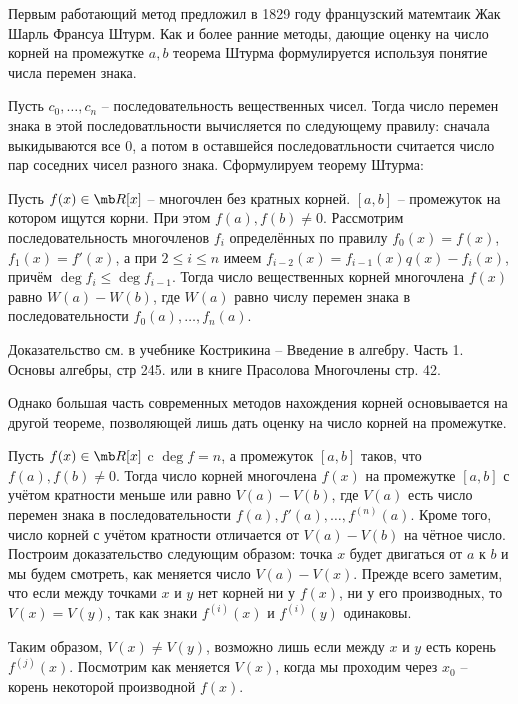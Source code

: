 Первым работающий метод предложил в 1829 году французский матемтаик Жак Шарль Франсуа Штурм. Как и более ранние методы, дающие оценку на число корней на промежутке $a,b$ теорема Штурма формулируется используя понятие числа перемен знака.

\dfn Пусть $c_0,\dots,c_n$ -- последовательность вещественных чисел. Тогда число  перемен знака в этой последоватльности вычисляется по следующему правилу: сначала выкидываются все 0, а потом в оставшейся последоватльности считается число пар соседних чисел разного знака.
\edfn
\noindent Сформулируем теорему Штурма:

\begin{thmm}[Штурм] Пусть $f(x) \in \mb R[x]$ -- многочлен без кратных корней. $[a,b]$ -- промежуток на котором ищутся корни. При этом $f(a),f(b)\neq 0$. Рассмотрим последовательность многочленов $f_i$ определённых по правилу $f_0(x)=f(x)$, $f_1(x)=f'(x)$, а при $2\leq i\leq n$ имеем $f_{i-2}(x)=f_{i-1}(x)q(x)-f_i(x)$, причём $\deg f_i \leq \deg f_{i-1}$. Тогда число вещественных корней многочлена $f(x)$ равно $W(a)-W(b)$, где $W(a)$ равно числу перемен знака в последовательности $f_0(a),\dots,f_n(a)$. 
\end{thmm}

Доказательство см. в учебнике Кострикина -- Введение в алгебру. Часть 1. Основы алгебры, стр 245. или в книге Прасолова Многочлены стр. 42.

Однако большая часть современных методов нахождения корней основывается на другой теореме, позволяющей лишь дать оценку на число корней на промежутке. 

 Пусть $f(x)\in \mb R[x]$ c $\deg f=n$, а промежуток $[a,b]$ таков, что $f(a),f(b)\neq 0$. Тогда число корней многочлена $f(x)$ на промежутке $[a,b]$ с учётом кратности меньше или равно $V(a)-V(b)$, где $V(a)$ есть число перемен знака в последовательности $f(a),f'(a),\dots,f^{(n)}(a)$. Кроме того, число корней с учётом кратности отличается от $V(a)-V(b)$ на чётное число.
\ethrm
\proof Построим доказательство следующим образом: точка  $x$  будет двигаться от $a$ к $b$ и мы будем смотреть, как меняется число $V(a)-V(x)$. Прежде всего заметим, что если между точками  $x$  и $y$ нет корней ни у $f(x)$, ни у его производных, то $V(x)=V(y)$, так как знаки $f^{(i)}(x)$ и $f^{(i)}(y)$ одинаковы.

Таким образом, $V(x)\neq V(y)$, возможно лишь если между $x$ и $y$ есть корень $f^{(j)}(x)$. Посмотрим как меняется $V(x)$, когда мы проходим  через $x_0$ -- корень некоторой производной $f(x)$. 

